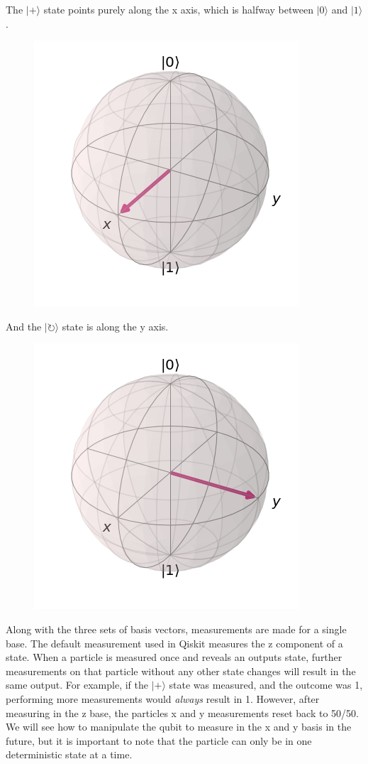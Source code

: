 \documentclass[11pt]{article}
\makeatletter
\def\maxwidth{\ifdim\Gin@nat@width>\linewidth\linewidth
    \else\Gin@nat@width\fi}
\let\Oldincludegraphics\includegraphics
\renewcommand{\includegraphics}[1]{\Oldincludegraphics[width=.8\maxwidth]{#1}}
\makeatother
\begin{document}
    The \(|+\rangle\) state points purely along the x axis, which is halfway
between \(|0\rangle\) and \(|1\rangle\).

\begin{figure}
\centering
\includegraphics{images/bloch_+.png}
\caption{}
\end{figure}

And the \(|\circlearrowright\rangle\) state is along the y axis.

\begin{figure}
\centering
\includegraphics{images/bloch_y.png}
\caption{}
\end{figure}

    Along with the three sets of basis vectors, measurements are made for a
single base. The default measurement used in Qiskit measures the z
component of a state. When a particle is measured once and reveals an
outputs state, further measurements on that particle without any other
state changes will result in the same output. For example, if the
\(|+\rangle\) state was measured, and the outcome was 1, performing more
measurements would \emph{always} result in 1. However, after measuring
in the z base, the particles x and y measurements reset back to 50/50.
We will see how to manipulate the qubit to measure in the x and y basis
in the future, but it is important to note that the particle can only be
in one deterministic state at a time.
\end{document}
